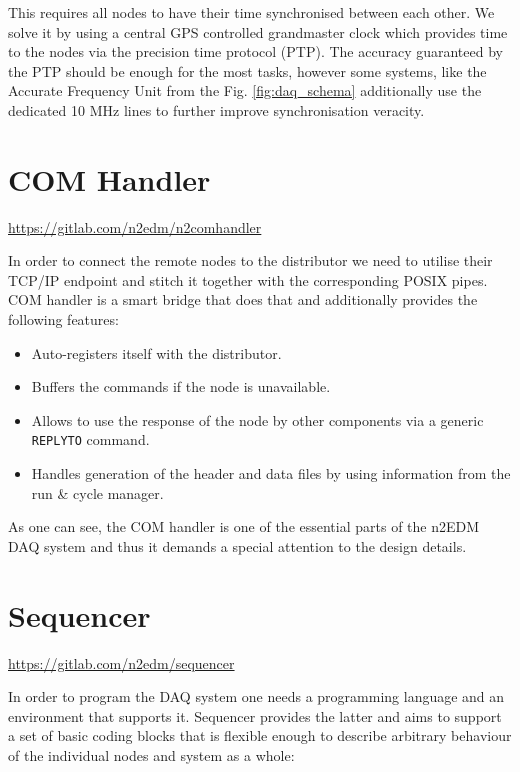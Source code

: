 This requires all nodes to have their time synchronised between each other. We solve it by using a central GPS controlled grandmaster clock which provides time to the nodes via the precision time protocol (PTP). The accuracy guaranteed by the PTP should be enough for the most tasks, however some systems, like the Accurate Frequency Unit from the Fig. \ref{fig:daq_schema} additionally use the dedicated 10 MHz lines to further improve synchronisation veracity.

\section{COM Handler}
\label{sec:com_handler}

\url{https://gitlab.com/n2edm/n2comhandler}

In order to connect the remote nodes to the distributor we need to utilise their TCP/IP endpoint and stitch it together with the corresponding POSIX pipes. COM handler is a smart bridge that does that and additionally provides the following features:

\begin{itemize}
	\item Auto-registers itself with the distributor.
	\item Buffers the commands if the node is unavailable.
	\item Allows to use the response of the node by other components via a generic \texttt{REPLYTO} command.
	\item Handles generation of the header and data files by using information from the run \& cycle manager.
\end{itemize}

As one can see, the COM handler is one of the essential parts of the n2EDM DAQ system and thus it demands a special attention to the design details.

\section{Sequencer}
\label{sec:sequencer}

\url{https://gitlab.com/n2edm/sequencer}

In order to program the DAQ system one needs a programming language and an environment that supports it. Sequencer provides the latter and aims to support a set of basic coding blocks that is flexible enough to describe arbitrary behaviour of the individual nodes and system as a whole:

